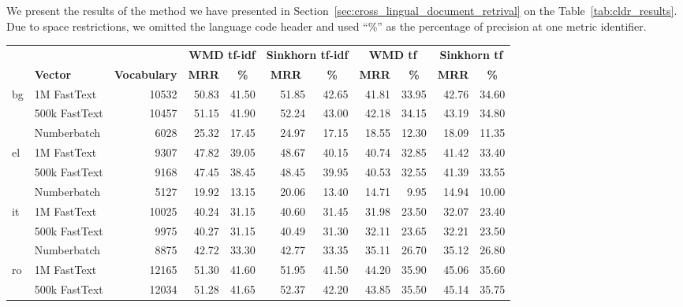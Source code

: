 We present the results of the method we have presented in Section~\ref{sec:cross_lingual_document_retrival} on the Table~\ref{tab:cldr_results}.
Due to space restrictions, we omitted the language code header and used \enquote{\%} as the percentage of precision at one metric identifier.

\begin{landscape}
\begin{table}[htbp]
\centering
\begin{tabular}{llrrrrrrrrr}
    \toprule
 &  &  & \multicolumn{2}{r}{\textbf{WMD tf-idf}} & \multicolumn{2}{r}{\textbf{Sinkhorn tf-idf}} & \multicolumn{2}{c}{\textbf{WMD tf}} & \multicolumn{2}{c}{\textbf{Sinkhorn tf}} \\ \cline{4-11}
 & \textbf{Vector} & \textbf{Vocabulary} & \multicolumn{1}{c}{\textbf{MRR}} & \multicolumn{1}{c}{\textbf{\%}} & \multicolumn{1}{c}{\textbf{MRR}} & \multicolumn{1}{c}{\textbf{\%}} & \multicolumn{1}{c}{\textbf{MRR}} & \multicolumn{1}{c}{\textbf{\%}} & \multicolumn{1}{c}{\textbf{MRR}} & \multicolumn{1}{c}{\textbf{\%}} \\ \cline{2-11}
\multirow{3}{*}{bg} & 1M FastText & 10532 & 50.83 & 41.50 & 51.85 & 42.65 & 41.81 & 33.95 & 42.76 & 34.60 \\
 & 500k FastText & 10457 & 51.15 & 41.90 & 52.24 & 43.00 & 42.18 & 34.15 & 43.19 & 34.80 \\
 & Numberbatch & 6028 & 25.32 & 17.45 & 24.97 & 17.15 & 18.55 & 12.30 & 18.09 & 11.35 \\ \cmidrule(lr){2-11}
\multirow{3}{*}{el} & 1M FastText & 9307 & 47.82 & 39.05 & 48.67 & 40.15 & 40.74 & 32.85 & 41.42 & 33.40 \\
 & 500k FastText & 9168 & 47.45 & 38.45 & 48.45 & 39.95 & 40.53 & 32.55 & 41.39 & 33.55 \\
 & Numberbatch & 5127 & 19.92 & 13.15 & 20.06 & 13.40 & 14.71 & 9.95 & 14.94 & 10.00 \\ \cmidrule(lr){2-11}
\multirow{3}{*}{it} & 1M FastText & 10025 & 40.24 & 31.15 & 40.60 & 31.45 & 31.98 & 23.50 & 32.07 & 23.40 \\
 & 500k FastText & 9975 & 40.27 & 31.15 & 40.49 & 31.30 & 32.11 & 23.65 & 32.21 & 23.50 \\
 & Numberbatch & 8875 & 42.72 & 33.30 & 42.77 & 33.35 & 35.11 & 26.70 & 35.12 & 26.80 \\ \cmidrule(lr){2-11}
\multirow{3}{*}{ro} & 1M FastText & 12165 & 51.30 & 41.60 & 51.95 & 41.50 & 44.20 & 35.90 & 45.06 & 35.60 \\
 & 500k FastText & 12034 & 51.28 & 41.65 & 52.37 & 42.20 & 43.85 & 35.50 & 45.14 & 35.75 \\

\end{tabular}
\end{table}
\end{landscape}
